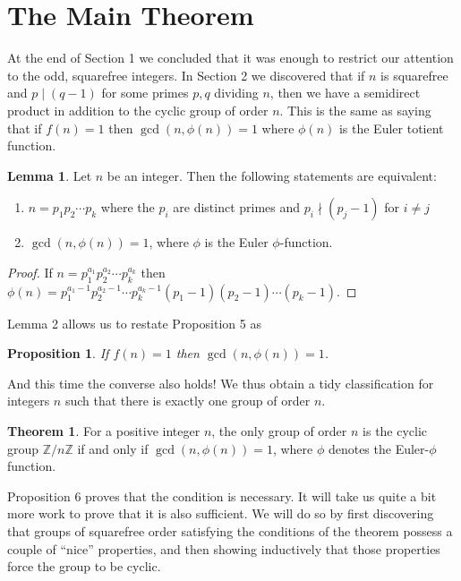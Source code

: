 \documentclass[12pt,reqno]{amsart}
\theoremstyle{plain}
\newtheorem{prop}[thm]{Proposition}
\theoremstyle{definition}
\numberwithin{equation}{section}
\newtheorem{theorem}{Theorem}[section]
\newtheorem{lemma}{Lemma}
\begin{document}
\section{The Main Theorem}

At the end of Section 1 we concluded that it was enough to restrict our attention to the odd, squarefree integers. In Section 2 we discovered that if $n$ is squarefree and $p \mid (q-1)$ for some primes $p, q$ dividing $n$, then we have a semidirect product in addition to the cyclic group of order $n$. This is the same as saying that if $f(n)=1$ then $\operatorname{gcd}(n,\phi(n))=1$ where $\phi(n)$ is the Euler totient function.

\begin{lemma}
Let $n$ be an integer. Then the following statements are equivalent:
\begin{enumerate}[itemsep=5pt]
    \item[(a)] $n=p_1 p_2 \cdots p_k$ where the $p_i$ are distinct primes and $p_i \nmid (p_j-1)$ for $i\ne j$
    \item[(b)] $\operatorname{gcd}(n,\phi(n))=1$, where $\phi$ is the Euler $\phi$-function.
\end{enumerate}
\end{lemma}
\begin{proof}
If $n=p_1^{a_1}p_2^{a_2}\cdots p_k^{a_k}$ then $\phi(n)=p_1^{a_1-1}p_2^{a_2-1}\cdots p_k^{a_k-1}(p_1-1)(p_2-1)\cdots(p_k-1)$.
\end{proof}

Lemma 2 allows us to restate Proposition 5 as

\begin{prop}
If $f(n)=1$ then $\operatorname{gcd}(n,\phi(n))=1$.
\end{prop}

And this time the converse also holds! We thus obtain a tidy classification for integers $n$ such that there is exactly one group of order $n$.

\begin{theorem}
For a positive integer $n$, the only group of order $n$ is the cyclic group $\mathbb{Z}/n\mathbb{Z}$ if and only if $\operatorname{gcd}(n,\phi(n))=1$, where $\phi$ denotes the Euler-$\phi$ function.
\end{theorem}

Proposition 6 proves that the condition is necessary. It will take us quite a bit more work to prove that it is also sufficient. We will do so by first discovering that groups of squarefree order satisfying the conditions of the theorem possess a couple of ``nice'' properties, and then showing inductively that those properties force the group to be cyclic.
\end{document}
